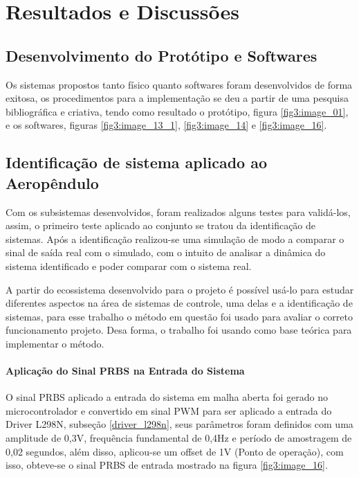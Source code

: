 \chapter{Resultados e Discussões}
\label{cap_3}

\section{Desenvolvimento do Protótipo e Softwares}

Os sistemas propostos tanto físico quanto softwares foram desenvolvidos de forma exitosa, os procedimentos para a implementação se deu a partir de uma pesquisa bibliográfica e criativa, tendo como resultado o protótipo, figura \ref{fig3:image_01}, e os softwares, figuras \ref{fig3:image_13_1}, \ref{fig3:image_14} e \ref{fig3:image_16}.


\section{Identificação de sistema aplicado ao Aeropêndulo}
\label{indentificacao}

Com os subsistemas desenvolvidos, foram realizados alguns testes para validá-los, assim, o primeiro teste aplicado ao conjunto se tratou da identificação de sistemas. Após a identificação realizou-se uma simulação de modo a comparar o sinal de saída real com o simulado, com o intuito de analisar a dinâmica do sistema identificado e poder comparar com o sistema real.

A partir do ecossistema desenvolvido para o projeto é possível usá-lo para estudar diferentes aspectos na área de sistemas de controle, uma delas e a identificação de sistemas, para esse trabalho o método em questão foi usado para avaliar o correto funcionamento projeto. Desa forma, o trabalho \cite{tcc_klarissa_ufpa} foi usando como base teórica para implementar o método.


\subsubsection{Aplicação do Sinal PRBS na Entrada do Sistema}

O sinal PRBS aplicado a entrada do sistema em malha aberta foi gerado no microcontrolador e convertido em sinal PWM para ser aplicado a entrada do Driver L298N, subseção \ref{driver_l298n}, seus parâmetros foram definidos com uma amplitude de 0,3V, frequência fundamental de 0,4Hz e período de amostragem de 0,02 segundos, além disso, aplicou-se um offset de 1V (Ponto de operação), com isso, obteve-se o sinal PRBS de entrada mostrado na figura \ref{fig3:image_16}.


